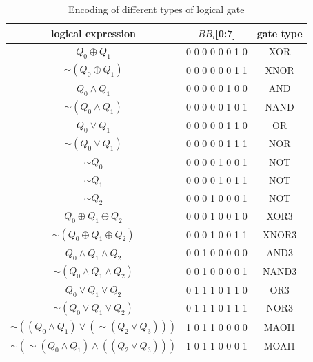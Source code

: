 \documentclass[final,5p,times,twocolumn]{elsarticle}
\begin{document}
\begin{table}[h]
    \caption{Encoding of different types of logical gate}\label{tab3}%
    \begin{tabular}{|c|c|c|}
        \hline
        logical expression                                   & $BB_i$[0:7]     & gate type \\
        \hline
        $Q_0 \oplus Q_1$                                     & 0 0 0 0 0 0 1 0 & XOR       \\
        $\sim (Q_0 \oplus Q_1)$                              & 0 0 0 0 0 0 1 1 & XNOR      \\
        $Q_0 \land Q_1$                                      & 0 0 0 0 0 1 0 0 & AND       \\
        $\sim (Q_0 \land Q_1)$                               & 0 0 0 0 0 1 0 1 & NAND      \\
        $Q_0 \lor Q_1$                                       & 0 0 0 0 0 1 1 0 & OR        \\
        $\sim (Q_0 \lor Q_1)$                                & 0 0 0 0 0 1 1 1 & NOR       \\
        $\sim Q_0$                                           & 0 0 0 0 1 0 0 1 & NOT       \\
        $\sim Q_1$                                           & 0 0 0 0 1 0 1 1 & NOT       \\
        $\sim Q_2$                                           & 0 0 0 1 0 0 0 1 & NOT       \\
        $Q_0 \oplus Q_1 \oplus Q_2$                          & 0 0 0 1 0 0 1 0 & XOR3      \\
        $\sim (Q_0 \oplus Q_1 \oplus Q_2)$                   & 0 0 0 1 0 0 1 1 & XNOR3     \\
        $Q_0 \land Q_1 \land Q_2$                            & 0 0 1 0 0 0 0 0 & AND3      \\
        $\sim (Q_0 \land Q_1 \land Q_2)$                     & 0 0 1 0 0 0 0 1 & NAND3     \\
        $Q_0 \lor Q_1 \lor Q_2$                              & 0 1 1 1 0 1 1 0 & OR3       \\
        $\sim (Q_0 \lor Q_1 \lor Q_2)$                       & 0 1 1 1 0 1 1 1 & NOR3      \\
        $\sim ((Q_0 \land Q_1) \lor (\sim (Q_2 \lor Q_3)))$  & 1 0 1 1 0 0 0 0 & MAOI1     \\
        $\sim (\sim (Q_0 \land Q_1) \land ((Q_2 \lor Q_3)))$ & 1 0 1 1 0 0 0 1 & MOAI1     \\
        \hline
    \end{tabular}
\end{table}
\end{document}

